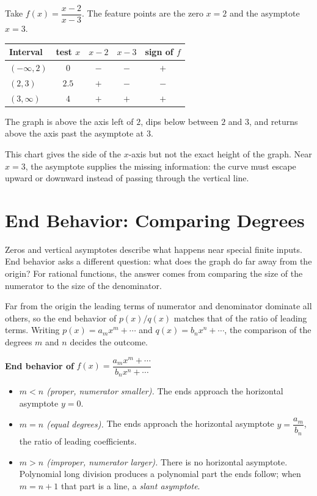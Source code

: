 \documentclass[12pt]{book}
\begin{document}
\begin{example}
Take $f(x)=\dfrac{x-2}{x-3}$. The feature points are the zero $x=2$ and the
asymptote $x=3$.
\begin{center}
\renewcommand{\arraystretch}{1.3}
\begin{tabular}{@{}lcccc@{}}
\toprule
Interval & test $x$ & $x-2$ & $x-3$ & sign of $f$\\
\midrule
$(-\infty,2)$ & $0$ & $-$ & $-$ & $+$\\
$(2,3)$       & $2.5$ & $+$ & $-$ & $-$\\
$(3,\infty)$  & $4$ & $+$ & $+$ & $+$\\
\bottomrule
\end{tabular}
\end{center}
The graph is above the axis left of $2$, dips below between $2$ and $3$, and returns
above the axis past the asymptote at $3$.
\end{example}

This chart gives the side of the $x$-axis but not the exact height of the graph. Near
$x=3$, the asymptote supplies the missing information: the curve must escape upward
or downward instead of passing through the vertical line.

\section{End Behavior: Comparing Degrees}

Zeros and vertical asymptotes describe what happens near special finite inputs. End
behavior asks a different question: what does the graph do far away from the origin?
For rational functions, the answer comes from comparing the size of the numerator to
the size of the denominator.

Far from the origin the leading terms of numerator and denominator dominate all
others, so the end behavior of $p(x)/q(x)$ matches that of the ratio of leading
terms. Writing $p(x)=a_m x^m+\cdots$ and $q(x)=b_n x^n+\cdots$, the comparison of the
degrees $m$ and $n$ decides the outcome.

\begin{keyidea}
\textbf{End behavior of} $f(x)=\dfrac{a_m x^m+\cdots}{b_n x^n+\cdots}$
\begin{itemize}\setlength{\itemsep}{2pt}
  \item \emph{$m<n$ (proper, numerator smaller).} The ends approach the horizontal
        asymptote $y=0$.
  \item \emph{$m=n$ (equal degrees).} The ends approach the horizontal asymptote
        $y=\dfrac{a_m}{b_n}$, the ratio of leading coefficients.
  \item \emph{$m>n$ (improper, numerator larger).} There is no horizontal asymptote.
        Polynomial long division produces a polynomial part the ends follow; when
        $m=n+1$ that part is a line, a \emph{slant asymptote}.
\end{itemize}
\end{keyidea}
\end{document}
